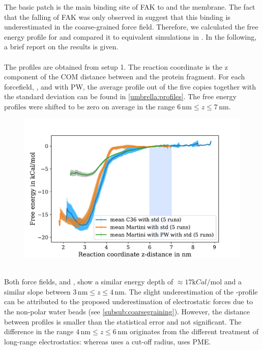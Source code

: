 \label{results:umbrella}
The basic patch is the main binding site of FAK to \pip{} and the membrane. The fact that the falling of FAK was only observed in \martini{} suggest that this binding is underestimated in the coarse-grained force field. Therefore, we calculated the free energy profile for \martini{} and compared it to equivalent simulations in \charmm{}. In the following, a brief report on the results is given.\\
\\
The profiles are obtained from setup 1. The reaction coordinate is the z component of the COM distance between \pip{} and the protein fragment. For each forcefield, \charmm{}, \martini{} and \martini{} with PW, the average profile out of the five copies together with the standard deviation can be found in \autoref{umbrella:profiles}. The free energy profiles were shifted to be zero on average in the range $6\,\si{\nano\metre} \le z \le 7\,\si{\nano\metre}$.\\
%
%
%
\begin{figure}[hbt]
	\centering
	\includegraphics[width=.8\textwidth]{figures/results/umbrella}
	\label{umbrella:profiles}
\end{figure}
%
%
%
\\
Both force fields, \charmm{} and \martini{}, show a similar energy depth of $\approx 17 \si{\kilo Cal/\mole}$ and a similar slope between $3\,\si{\nano\metre} \le z \le 4\,\si{\nano\metre}$. The slight underestimation of the \martini{}-profile can be attributed to the proposed underestimation of electrostatic forces due to the non-polar water beads (see \autoref{subsub:coarsegraining}). However, the distance between profiles is smaller than the statistical error and not significant. The difference in the range $4\,\si{\nano\metre} \le z \le 6\,\si{\nano\metre}$ originates from the different treatment of long-range electrostatics: whereas \martini{} uses a cut-off radius, \charmm{} uses PME.\\
